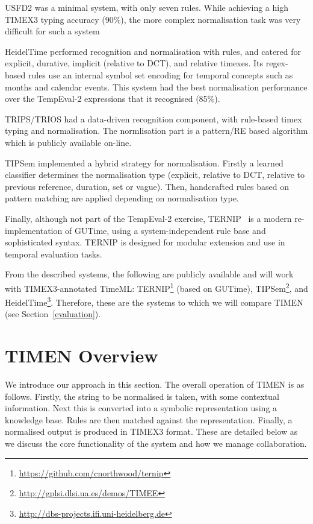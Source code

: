 \documentclass[10pt, a4paper]{article}
\begin{document}
USFD2 \cite{Derczynski2010-TempEval2-USFD2} was a minimal system, with only seven rules. While achieving a high TIMEX3 typing accuracy (90\%), the more complex normalisation task was very difficult for such a system

HeidelTime \cite{Strotgen2010-TempEval2-Heidel} performed recognition and normalisation with rules, and catered for explicit, durative, implicit (relative to DCT), and relative timexes. Its regex-based rules use an internal symbol set encoding for temporal concepts such as months and calendar events. This system had the best normalisation performance over the TempEval-2 expressions that it recognised (85\%).

TRIPS/TRIOS \cite{UzzamanAllen2010-TempEval2-TRIPS-TRIOS} had a data-driven recognition component, with rule-based timex typing and normalisation. The normlisation part is a pattern/RE based algorithm which is publicly available on-line.

TIPSem \cite{Llorens2010TempEval-2} implemented a hybrid strategy for normalisation. Firstly a learned classifier determines the normalisation type (explicit, relative to DCT, relative to previous reference, duration, set or vague). Then, handcrafted rules based on pattern matching are applied depending on normalisation type.

Finally, although not part of the TempEval-2 exercise, TERNIP~\cite{ternip} is a modern re-implementation of GUTime, using a system-independent rule base and sophisticated syntax. TERNIP is designed for modular extension and use in temporal evaluation tasks.

From the described systems, the following are publicly available and will work with TIMEX3-annotated TimeML: TERNIP\footnote{\scriptsize \url{https://github.com/cnorthwood/ternip}} (based on GUTime), TIPSem\footnote{\scriptsize \url{http://gplsi.dlsi.ua.es/demos/TIMEE}}, and HeidelTime\footnote{\scriptsize \url{http://dbs-projects.ifi.uni-heidelberg.de}}. Therefore, these are the systems to which we will compare TIMEN (see Section~\ref{evaluation}).


\section{TIMEN Overview}
\label{overview}

We introduce our approach in this section. The overall operation of TIMEN is as follows. Firstly, the string to be normalised is taken, with some contextual information. Next this is converted into a symbolic representation using a knowledge base. Rules are then matched against the representation. Finally, a normalised output is produced in TIMEX3 format. These are detailed below as we discuss the core functionality of the system and how we manage collaboration.
\end{document}
